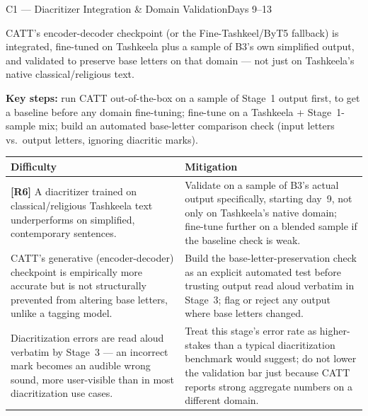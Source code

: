 \documentclass[11pt,a4paper]{article}
\begin{document}
\begin{milestonehead}{C1 --- Diacritizer Integration \& Domain Validation}{Days 9--13}
\begin{goalbox}
CATT's encoder-decoder checkpoint (or the Fine-Tashkeel/ByT5 fallback) is
integrated, fine-tuned on Tashkeela plus a sample of B3's own simplified
output, and validated to preserve base letters on that domain --- not just
on Tashkeela's native classical/religious text.
\end{goalbox}

\textbf{Key steps:} run CATT out-of-the-box on a sample of Stage~1 output
first, to get a baseline before any domain fine-tuning; fine-tune on a
Tashkeela + Stage~1-sample mix; build an automated base-letter comparison
check (input letters vs.\ output letters, ignoring diacritic marks).

\begin{center}
\small
\begin{tabular}{@{}p{6.3cm}p{6.9cm}@{}}
\toprule
\textbf{Difficulty} & \textbf{Mitigation} \\
\midrule
\textbf{[R6]} A diacritizer trained on classical/religious Tashkeela text
underperforms on simplified, contemporary sentences. & Validate on a sample
of B3's actual output specifically, starting day~9, not only on Tashkeela's
native domain; fine-tune further on a blended sample if the baseline check
is weak. \\
\addlinespace
CATT's generative (encoder-decoder) checkpoint is empirically more accurate
but is not structurally prevented from altering base letters, unlike a
tagging model. & Build the base-letter-preservation check as an explicit
automated test before trusting output read aloud verbatim in Stage~3;
flag or reject any output where base letters changed. \\
\addlinespace
Diacritization errors are read aloud verbatim by Stage~3 --- an incorrect
mark becomes an audible wrong sound, more user-visible than in most
diacritization use cases. & Treat this stage's error rate as higher-stakes
than a typical diacritization benchmark would suggest; do not lower the
validation bar just because CATT reports strong aggregate numbers on a
different domain. \\
\bottomrule
\end{tabular}
\end{center}
\end{milestonehead}

\newpage
\end{document}
